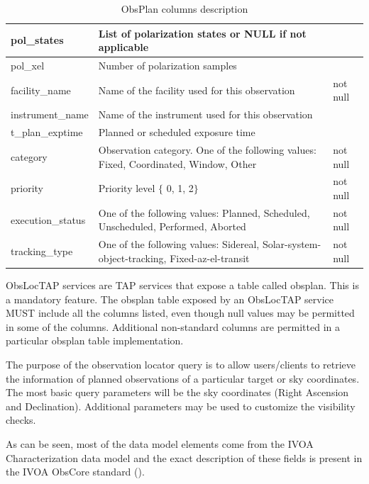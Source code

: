 \documentclass[11pt,a4paper]{ivoa}
\begin{document}
\begin{landscape}
\begin{table}
\begin{tabular}{ |l|l|l| }
\hline
pol\_states &
List of polarization states or NULL if not applicable &
\\
\hline
pol\_xel &
Number of polarization samples &
\\
\hline
facility\_name &
Name of the facility used for this observation &
not null\\
\hline
instrument\_name &
Name of the instrument used for this observation &
\\
\hline
t\_plan\_exptime &
Planned or scheduled exposure time &
\\
\hline
category &
Observation category. One of the following values: Fixed, Coordinated, Window, 
Other &
not null\\
\hline
priority &
Priority level $ \{ $ 0, 1, 2$ \} $ &
not null\\
\hline
execution\_status &
One of the following values:  Planned, Scheduled, Unscheduled, Performed, Aborted &
not null\\
\hline
tracking\_type &
One of the following values:  Sidereal, Solar-system-object-tracking, 
Fixed-az-el-transit &
not null\\
\hline
\end{tabular}
\caption{ObsPlan columns description}
\label{tab:obsplancolumns}
\end{table}
\end{landscape}

ObsLocTAP services are TAP services that expose a table called obsplan. This
is a mandatory feature. The obsplan table exposed by an ObsLocTAP service MUST
include all  the columns listed, even though null values may be permitted in
some of the columns. Additional non-standard columns are permitted in a 
particular obsplan table implementation.

The purpose of the observation locator query is to allow users/clients to
retrieve the information of planned observations of a particular target or
sky coordinates. The most basic query parameters will be the sky coordinates
(Right Ascension and Declination). Additional parameters may be used to
customize the visibility checks.

As can be seen, most of the data model elements come from the IVOA
Characterization data model and the exact description of these fields is
present in the IVOA ObsCore standard (\citealt{2017ivoa.spec.0509L}).
\end{document}
